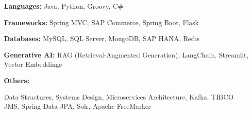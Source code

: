 \begin{cvskills}

  \cvskill
    {\bf Languages:}
    { Java, Python, Groovy, C\#}

  \cvskill
    {\bf Frameworks:}
    {Spring MVC, SAP Commerce, Spring Boot, Flask}

  \cvskill
    {\bf Databases:}
    {MySQL, SQL Server, MongoDB, SAP HANA, Redis}

  \cvskill
    {\bf Generative AI:}
    {RAG (Retrieval-Augmented Generation), LangChain, Streamlit, Vector Embeddings}

  \cvskill
    {\bf Others:}
    {\parbox[t]{0.95\linewidth}{Data Structures, Systems Design, Microservices Architecture, Kafka, TIBCO JMS, Spring Data JPA, Solr, Apache FreeMarker}}

\end{cvskills}
